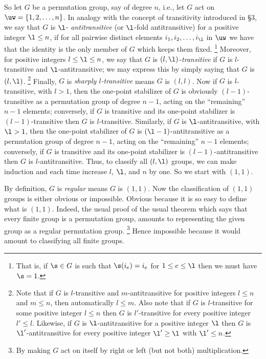 So let $G$ be a permutation group, say of degree $n$, 
i.e., let $G$ act on
$\uw = \{1,2,\dots,n \}$.  In analogy with the concept of 
transitivity
introduced in \S3, we say that $G$ is $\l$-{\it 
antitransitive}
(or $\l$-fold antitransitive) for a positive integer $\l 
\leq n$, if for
all pairwise distinct elements $i_1, i_2, \dots , i_{\l}$ 
in $\uw$ we 
have that the identity is the only member of $G$ which 
keeps them fixed.
\footnote{ That is, if $\s \in G$ is such that 
$\s(i_e)=i_e$ for $1 \leq
e \leq \l$ then we must have $\s = 1$.}
Moreover, for positive integers $l \leq \l \leq n$, we say 
that $G$ is
$(l,\l)$-{\it transitive} if $G$ is $l$-transitive and 
$\l$-antitransitive;
we may express this by simply saying that $G$ is $(l,\l)$.
\footnote{Note that if $G$ is $l$-transitive and 
$m$-antitransitive for
positive integers $l \leq n$ and $m \leq n$, then 
automatically
$l \leq m$.  Also note that if $G$ is $l$-transitive for 
some positive 
integer $l \leq n$ then $G$ is $l'$-transitive for every 
positive
integer $l' \leq l$.  Likewise, if $G$ is 
$\l$-antitransitive for a positive 
integer $\l$ then $G$ is $\l'$-antitransitive for every 
positive integer $\l'
\geq \l$ with $\l' \leq n$.}
Finally, $G$ is {\it sharply $l$-transitive} means $G$ is 
$(l,l)$.  Now
if $G$ is $l$-transitive, with $l > 1$, then the one-point 
stabilizer
of $G$ is obviously $(l-1)$-transitive
as a permutation group of degree $n-1$, acting on the 
``remaining'' $n-1$
elements; conversely, if $G$ is transitive and its 
one-point stabilizer is
$(l-1)$-transitive then $G$ is $l$-transitive.  
Similarly, if $G$ is $\l$-antitransitive, with $\l > 1$, 
then the one-point stabilizer of $G$ is 
$(\l-1)$-antitransitive  
as a permutation group of degree $n-1$, acting on the 
``remaining'' $n-1$
elements; conversely, if $G$ is transitive and its 
one-point stabilizer is
$(l-1)$-antitransitive then $G$ is $l$-antitransitive.  
Thus, to classify all $(l,\l)$ groups, we can make 
induction and each time 
increase $l$, $\l$,  and $n$ by one.  So we start with 
$(1,1)$.

By definition, $G$ is {\it regular} means $G$ is $(1,1)$.  
Now the 
classification of $(1,1)$ groups is either obvious or 
impossible.  
Obvious because it is so easy to define what is $(1,1)$.  
Indeed,
the usual proof of the usual theorem which says that every 
finite group 
is a permutation group, amounts to representing the given 
group
as a regular permutation group.
\footnote{ By making $G$ act on itself by right or left 
(but not
both) multiplication.}
Hence impossible because it would amount to classifying 
all finite groups.

